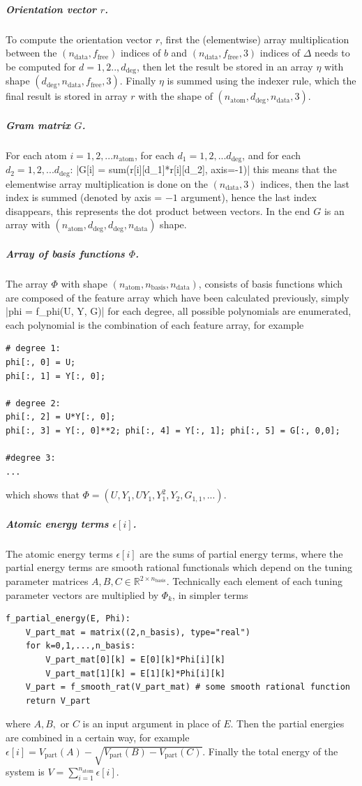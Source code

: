 \documentclass[12pt]{article}
\begin{document}
\subparagraph{Orientation vector $r$.}
To compute the orientation vector $r$, first  the (elementwise) array multiplication between the $(n_\text{data}, f_\text{free})$ indices of $b$ and $(n_\text{data}, f_\text{free}, 3)$ indices of $\Delta$ needs to be computed for $d=1,2..,d_\text{deg}$, then let the result be stored in an array $\eta$ with shape $(d_\text{deg}, n_\text{data}, f_\text{free}, 3)$. Finally $\eta$ is summed using the indexer rule, which the final result is stored in array $r$ with the shape of $(n_\text{atom}, d_\text{deg}, n_\text{data}, 3)$.

\subparagraph{Gram matrix $G$.}
For each atom $i=1,2, ... n_\text{atom}$, for each $d_1 = 1,2,... d_\text{deg}$, and for each $d_2 = 1,2,... d_\text{deg}$:
|G[i] = sum(r[i][d_1]*r[i][d_2], axis=-1)|
\noindent this means that the elementwise array multiplication is done on the $(n_\text{data}, 3)$ indices, then the last index is summed (denoted by axis = $-1$ argument), hence the last index disappears, this represents the dot product between vectors. In the end $G$ is an array with $(n_\text{atom}, d_\text{deg}, d_\text{deg}, n_\text{data})$ shape.

\subparagraph{Array of basis functions $\Phi$.}
The array $\Phi$ with shape $(n_\text{atom}, n_\text{basis}, n_\text{data})$, consists of basis functions which are composed of the feature array which have been calculated previously, simply
|phi = f_phi(U, Y, G)|
\noindent 
for each degree, all possible polynomials are enumerated, each polynomial is the combination of each feature array, for example
\begin{verbatim}
# degree 1:
phi[:, 0] = U;
phi[:, 1] = Y[:, 0];

# degree 2:
phi[:, 2] = U*Y[:, 0];
phi[:, 3] = Y[:, 0]**2; phi[:, 4] = Y[:, 1]; phi[:, 5] = G[:, 0,0];

#degree 3:
...

\end{verbatim}
which shows that $\Phi = (U, Y_1, UY_1, Y_1^2, Y_2, G_{1,1}, ...)$.

\subparagraph{Atomic energy terms $\epsilon[i]$.}
The atomic energy terms $\epsilon[i]$ are the sums of partial energy terms, where the partial energy terms are smooth rational functionals which depend on the tuning parameter matrices $A, B, C \in \mathbb{R}^{2 \times n_\text{basis}}$. Technically each element of each tuning parameter vectors are multiplied by $\Phi_k$, in simpler terms
\begin{verbatim}
f_partial_energy(E, Phi):
    V_part_mat = matrix((2,n_basis), type="real")
    for k=0,1,...,n_basis:
        V_part_mat[0][k] = E[0][k]*Phi[i][k]
        V_part_mat[1][k] = E[1][k]*Phi[i][k]
    V_part = f_smooth_rat(V_part_mat) # some smooth rational function
    return V_part
\end{verbatim}
where $A, B,$ or $C$ is an input argument in place of $E$. Then the partial energies are combined in a certain way, for example $\epsilon[i] = V_\text{part}(A) - \sqrt{V_\text{part}(B) - V_\text{part}(C)}$. Finally the total energy of the system is $V = \sum^{n_\text{atom}}_{i=1} \epsilon[i]$.
\end{document}
